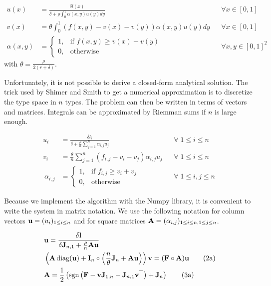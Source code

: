 \begin{align*}[left=\empheqlbrace]
	u(x) &= \frac{\delta l(x)}{\delta + \rho \int_{0}^{1} \alpha(x,y) u(y) dy} &&\forall x \in [0,1]\\
	v(x) &= \theta \int_{0}^{1} (f(x,y)-v(x)-v(y)) \alpha(x,y) u(y) dy &&\forall x \in [0,1]\\
	\alpha(x,y) &=
	\begin{cases}
		1, & \text{if } f(x,y) \geq v(x)+v(y)\\
		0, & \text{otherwise}
	\end{cases}
	&&\forall x,y \in [0,1]^2 
\end{align*}
with $\theta = \frac{\rho}{2(r+\delta)}$.


Unfortunately, it is not possible to derive a closed-form analytical solution. The trick used by Shimer and Smith \citep{shimer_assortative_2000} to get a numerical approximation is to discretize the type space in $n$ types. The problem can then be written in terms of vectors and matrices. Integrals can be approximated by Riemman sums if $n$ is large enough.

\begin{align*}[left=\empheqlbrace]
	u_i &= \frac{\delta l_i}{\delta + \frac{\rho}{n} \sum\limits_{j=1}^{n} \alpha_{i,j} u_j} &&\forall \; 1 \leq i \leq n\\
	v_i &= \frac{\theta}{n} \sum_{j=1}^{n} (f_{i,j}-v_i-v_j) \alpha_{i,j} u_j &&\forall \; 1 \leq i \leq n\\\
	\alpha_{i,j} &=
	\begin{cases}
		1, & \text{if } f_{i,j} \geq v_i+v_j\\
		0, & \text{otherwise}
	\end{cases}
	&&\forall \; 1 \leq i,j \leq n\
\end{align*}


Because we implement the algorithm with the Numpy library, it is convenient to write the system in matrix notation. We use the following notation for column vectors $\boldsymbol{\mathbf{u}} = (u_i)_{1 \leq i \leq n}$ and for square matrices $\boldsymbol{\mathbf{A}} = (\alpha_{i,j})_{1 \leq i \leq n, 1 \leq j \leq n}$.





\begin{align}[left=\empheqlbrace]
	&\vect{u} = \frac{\delta \vect{l}}{\delta \vect{J}_{n,1} + \frac{\rho}{n} \vect{A}\vect{u}}\\
	&\left(\vect{A} \diag(\vect{u}) + \vect{I}_n \circ \left(\frac{n}{\theta} \vect{J}_n + \vect{A} \vect{u}\right)\right) \vect{v} = (\vect{F} \circ \vect{A}) \vect{u}
	\tag{2a}\\
	&\vect{A} = \frac{1}{2} \left( \sgn{\left( \vect{F} - \vect{v} \vect{J}_{1,n} - \vect{J}_{n,1} \vect{v}^\top \right)} + \vect{J}_n \right)
	\tag{3a}
\end{align}
 

